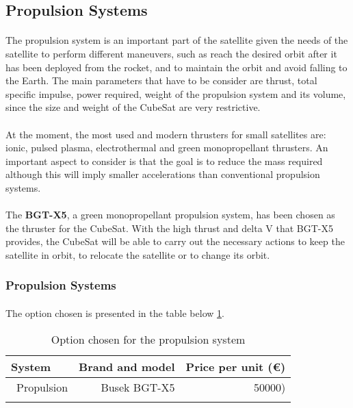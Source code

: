 \subsection{Propulsion Systems}

\paragraph{}The propulsion system is an important part of the satellite given the needs of the satellite to perform different maneuvers, such as reach the desired orbit after it has been deployed from the rocket, and to maintain the orbit and avoid falling to the Earth. The main parameters that have to be consider are thrust, total specific impulse, power required, weight of the propulsion system and its volume, since the size and weight of the CubeSat are very restrictive.

\paragraph{}At the moment, the most used and modern thrusters for small satellites are: ionic, pulsed plasma, electrothermal and green monopropellant thrusters. An important aspect to consider is that the goal is to reduce the mass required although this will imply smaller accelerations than conventional propulsion systems.

\paragraph{}The \textbf{BGT-X5}, a green monopropellant propulsion system, has been chosen as the thruster for the CubeSat. With the high thrust and delta V that BGT-X5 provides, the CubeSat will be able to carry out the necessary actions to keep the satellite in orbit, to relocate the satellite or to change its orbit.

\subsubsection{Propulsion Systems}
\paragraph{}The option chosen is presented in the table below \ref{propulsionfinal}.

\begin{longtable}{| l | r | r | }
\hline
\rowcolor[gray]{0.80}	\textbf{System} &  \textbf{Brand and model}     & \textbf{Price per unit (\euro)}   \\
\hline
\endfirsthead

	   ~Propulsion & Busek BGT-X5 & 50000) \\
	\hline

\caption{Option chosen for the propulsion system}
\label{propulsionfinal}
\end{longtable}
